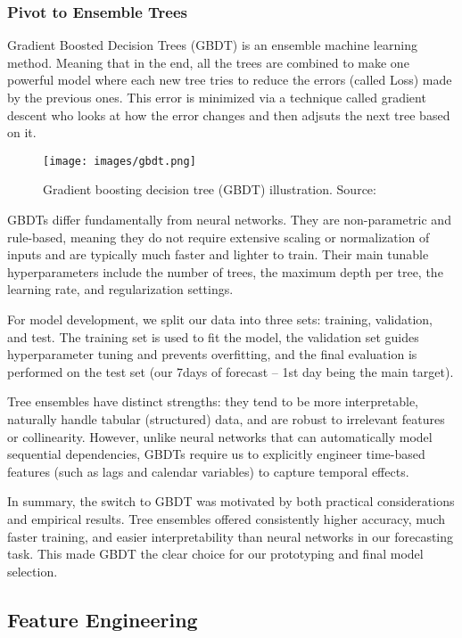 \subsubsection*{Pivot to Ensemble Trees}  
Gradient Boosted Decision Trees (GBDT) is an ensemble machine learning method. Meaning that in the 
end, all the trees are combined to make one powerful model where each new tree tries to reduce 
the errors (called Loss) made by the previous ones. This error is minimized via a technique called
gradient descent who looks at how the error changes and then adjsuts the next tree based on it.

\begin{figure}[h!]
\centering
\texttt{[image: images/gbdt.png]}
\caption{Gradient boosting decision tree (GBDT) illustration. Source: \cite{SaniAbba2022}}
\label{fig:gbdt-illustration}
\end{figure}

GBDTs differ fundamentally from neural networks. They are non-parametric and rule-based, 
meaning they do not require extensive scaling or normalization of inputs and are typically 
much faster and lighter to train. Their main tunable hyperparameters include the number of 
trees, the maximum depth per tree, the learning rate, and regularization settings.

For model development, we split our data into three sets: training, validation, and test. 
The training set is used to fit the model, the validation set guides hyperparameter tuning 
and prevents overfitting, and the final evaluation is performed on the test set (our 7days 
of forecast -- 1st day being the main target).

Tree ensembles have distinct strengths: they tend to be more interpretable, naturally 
handle tabular (structured) data, and are robust to irrelevant features or collinearity. 
However, unlike neural networks that can automatically model sequential dependencies, 
GBDTs require us to explicitly engineer time-based features (such as lags and calendar 
variables) to capture temporal effects.

In summary, the switch to GBDT was motivated by both practical considerations and 
empirical results. Tree ensembles offered consistently higher accuracy, much faster 
training, and easier interpretability than neural networks in our forecasting task. 
This made GBDT the clear choice for our prototyping and final model selection.

\subsection{Feature Engineering}


